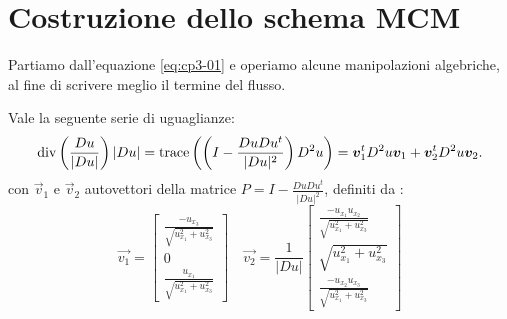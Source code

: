 \section{Costruzione dello schema MCM}
Partiamo dall'equazione \eqref{eq:cp3-01} e operiamo alcune manipolazioni algebriche, al fine di scrivere meglio il termine del flusso. 
\begin{proposizione}
Vale la seguente serie di uguaglianze:
\[
\operatorname{div}\left(\frac{Du}{|Du|}\right)|Du|=\operatorname{trace}\left(\left(I-\frac{DuDu^t}{|Du|^2}\right)D^2u\right)=\bm{v}_1^tD^2u\bm{v}_1+\bm{v}_2^tD^2u\bm{v}_2.
\]
con $\vec{v}_1$ e $\vec{v}_2$ autovettori della matrice $P=I-\frac{DuDu^t}{|Du|^2}$, definiti da :
\[
\vec{v_1}=
\begin{bmatrix}
\frac{-u_{x_3}}{\sqrt{u_{x_1}^2+u_{x_3}^2}} \\
0 \\
\frac{u_{x_1}}{\sqrt{u_{x_1}^2+u_{x_3}^2}}
\end{bmatrix}
\quad
\vec{v_2}=\frac{1}{|Du|}
\begin{bmatrix}
\frac{-u_{x_1}u_{x_2}}{\sqrt{u_{x_1}^2+u_{x_3}^2}} \\
\sqrt{u_{x_1}^2+u_{x_3}^2} \\
\frac{-u_{x_2}u_{x_3}}{\sqrt{u_{x_1}^2+u_{x_3}^2}}
\end{bmatrix}
\]
\end{proposizione}
